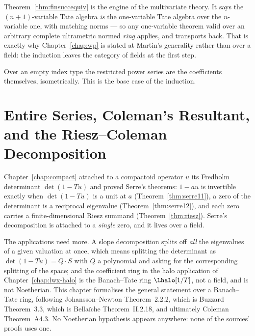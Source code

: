 Theorem~\ref{thm:finsuccequiv} is the engine of the multivariate theory.  It says the
$(n+1)$-variable Tate algebra \emph{is} the one-variable Tate algebra over the $n$-variable one,
with matching norms --- so any one-variable theorem valid over an arbitrary complete ultrametric
normed \emph{ring} applies, and transports back.  That is exactly why Chapter~\ref{chap:wp} is
stated at Martin's generality rather than over a field: the induction leaves the category of
fields at the first step.

\begin{lemma}
  \label{lem:isemptyequiv}
  \leanok
  Over an empty index type the restricted power series are the coefficients themselves,
  isometrically.  This is the base case of the induction.
\end{lemma}


\chapter{Entire Series, Coleman's Resultant, and the Riesz--Coleman Decomposition}
\label{chap:riesz-coleman}

Chapter~\ref{chap:compact} attached to a compactoid operator $u$ its Fredholm determinant
$\det(1-Tu)$ and proved Serre's theorems: $1-au$ is invertible exactly when $\det(1-Tu)$ is a
unit at $a$ (Theorem~\ref{thm:serre11}), a zero of the determinant is a reciprocal eigenvalue
(Theorem~\ref{thm:serre12}), and each zero carries a finite-dimensional Riesz summand
(Theorem~\ref{thm:riesz}).  Serre's decomposition is attached to a \emph{single} zero, and it
lives over a field.

The applications need more.  A slope decomposition splits off \emph{all} the eigenvalues of a
given valuation at once, which means splitting the determinant as $\det(1-Tu) = Q\cdot S$ with
$Q$ a polynomial and asking for the corresponding splitting of the space; and the coefficient
ring in the halo application of Chapter~\ref{chap:lwx-halo} is the Banach--Tate ring
$\Lhalo[1/T]$, not a field, and is not Noetherian.  This chapter formalises the general
statement over a Banach--Tate ring, following Johansson--Newton \cite{JN} Theorem~2.2.2, which
is Buzzard \cite{Buzzard} Theorem~3.3, which is Bella\"iche \cite{Bellaiche} Theorem~II.2.18,
and ultimately Coleman \cite{Coleman} Theorem~A4.3.  No Noetherian hypothesis appears anywhere:
none of the sources' proofs uses one.

